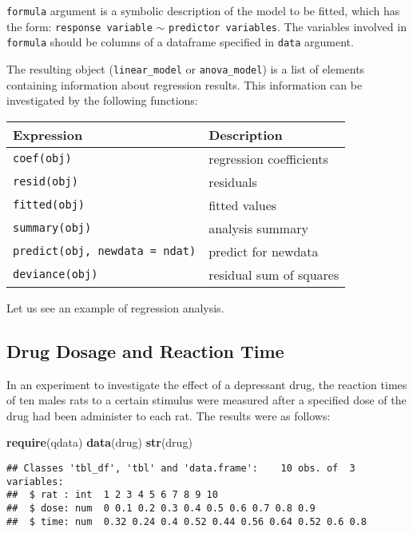\documentclass[]{book}
\newenvironment{Shaded}{\begin{snugshade}}{\end{snugshade}}
\newcommand{\KeywordTok}[1]{\textcolor[rgb]{0.13,0.29,0.53}{\textbf{{#1}}}}
\newcommand{\NormalTok}[1]{{#1}}
\begin{document}
\clearpage

\texttt{formula} argument is a symbolic description of the model to be
fitted, which has the form: \texttt{response\ variable} \(\sim\)
\texttt{predictor\ variables}. The variables involved in
\texttt{formula} should be columns of a dataframe specified in
\texttt{data} argument.

The resulting object (\texttt{linear\_model} or \texttt{anova\_model})
is a list of elements containing information about regression results.
This information can be investigated by the following functions:

\begin{longtable}[]{@{}ll@{}}
\toprule
Expression & Description\tabularnewline
\midrule
\endhead
\texttt{coef(obj)} & regression coefficients\tabularnewline
\texttt{resid(obj)} & residuals\tabularnewline
\texttt{fitted(obj)} & fitted values\tabularnewline
\texttt{summary(obj)} & analysis summary\tabularnewline
\texttt{predict(obj,\ newdata\ =\ ndat)} & predict for
newdata\tabularnewline
\texttt{deviance(obj)} & residual sum of squares\tabularnewline
\bottomrule
\end{longtable}

Let us see an example of regression analysis.

\clearpage

\subsection{Drug Dosage and Reaction
Time}\label{drug-dosage-and-reaction-time}

In an experiment to investigate the effect of a depressant drug, the
reaction times of ten males rats to a certain stimulus were measured
after a specified dose of the drug had been administer to each rat. The
results were as follows:

\begin{Shaded}
\begin{Highlighting}[]
\KeywordTok{require}\NormalTok{(qdata)}
\KeywordTok{data}\NormalTok{(drug)}
\KeywordTok{str}\NormalTok{(drug)}
\end{Highlighting}
\end{Shaded}

\begin{verbatim}
## Classes 'tbl_df', 'tbl' and 'data.frame':    10 obs. of  3 variables:
##  $ rat : int  1 2 3 4 5 6 7 8 9 10
##  $ dose: num  0 0.1 0.2 0.3 0.4 0.5 0.6 0.7 0.8 0.9
##  $ time: num  0.32 0.24 0.4 0.52 0.44 0.56 0.64 0.52 0.6 0.8
\end{verbatim}
\end{document}
